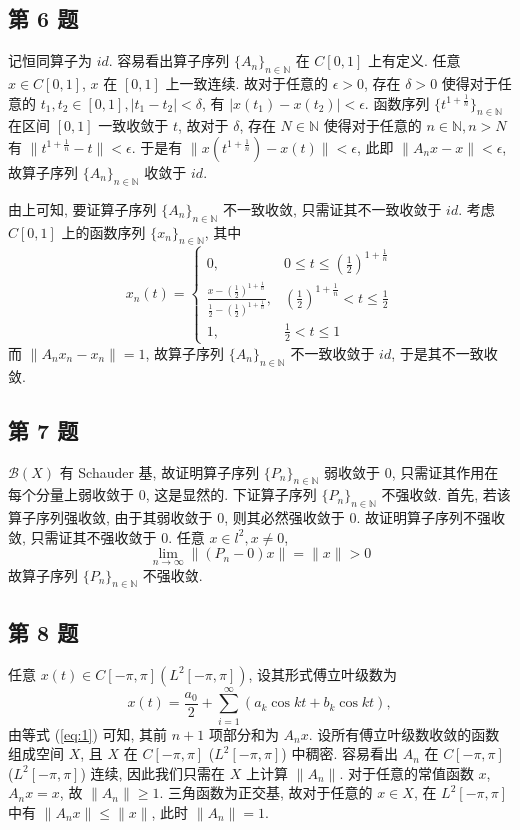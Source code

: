 \documentclass[\ROOT/main.tex]{subfiles}
\begin{document}
\subsection{第 6 题}
记恒同算子为 $id$.
容易看出算子序列 $\{ A_{n} \}_{n \in \mathbb{N}}$ 在 $C[0, 1]$ 上有定义.
任意 $x \in C[0, 1]$, $x$ 在 $[0,1]$ 上一致连续.
故对于任意的 $\epsilon > 0$,
存在 $\delta > 0$ 使得对于任意的 $t_1, t_2 \in [0, 1], | t_1 - t_2| < \delta$,
有 $| x(t_1) - x(t_2) | < \epsilon$.
函数序列 $\{ t^{1 + \frac{1}{n}} \}_{n \in \mathbb{N}}$ 在区间 $[0, 1]$ 一致收敛于 $t$,
故对于 $\delta$, 存在 $N \in \mathbb{N}$ 使得对于任意的 $n \in \mathbb{N}, n > N$ 有 $\| t^{1 + \frac{1}{n}} - t \| < \epsilon$.
于是有 $\| x(t^{1 + \frac{1}{n}}) - x(t) \| < \epsilon$,
此即 $\| A_n x - x \| < \epsilon$, 故算子序列 $\{ A_{n} \}_{n \in \mathbb{N}}$ 收敛于 $id$.

由上可知, 要证算子序列 $\{ A_{n} \}_{n \in \mathbb{N}}$ 不一致收敛, 只需证其不一致收敛于 $id$.
考虑 $C[0, 1]$ 上的函数序列 $\{ x_{n} \}_{n \in \mathbb{N}}$, 其中
\[
    x_n(t) = \begin{cases}
        0, & 0 \leqslant t \leqslant \left( \frac{1}{2} \right)^{1 + \frac{1}{n}} \\
        \frac{x - \left( \frac{1}{2} \right)^{1 + \frac{1}{n}}}{\frac{1}{2} - \left( \frac{1}{2} \right)^{1 + \frac{1}{n}}}, & \left( \frac{1}{2} \right)^{1 + \frac{1}{n}} < t \leqslant \frac{1}{2} \\
        1, & \frac{1}{2} < t \leqslant 1
    \end{cases}
\]
而 $\| A_n x_n - x_n \| = 1$, 故算子序列 $\{ A_{n} \}_{n \in \mathbb{N}}$ 不一致收敛于 $id$, 于是其不一致收敛.

\subsection{第 7 题}
$\mathscr{B}(X)$ 有 Schauder 基, 故证明算子序列 $\{ P_{n} \}_{n \in \mathbb{N}}$ 弱收敛于 $0$, 只需证其作用在每个分量上弱收敛于 $0$, 这是显然的.
下证算子序列 $\{ P_{n} \}_{n \in \mathbb{N}}$ 不强收敛.
首先, 若该算子序列强收敛, 由于其弱收敛于 $0$, 则其必然强收敛于 $0$.
故证明算子序列不强收敛, 只需证其不强收敛于 $0$.
任意 $x \in l^2, x \neq 0$,
\[
    \lim_{n \to \infty} \| (P_n - 0) x \| = \| x \| > 0
\]
故算子序列 $\{ P_{n} \}_{n \in \mathbb{N}}$ 不强收敛.


\subsection{第 8 题}
任意 $x(t) \in C[-\pi, \pi] (L^2[-\pi, \pi])$, 设其形式傅立叶级数为
\[
    x(t) = \frac{a_0}{2} + \sum_{i = 1}^{\infty}(a_k \cos{kt} + b_k \cos{kt}),
\]
由等式 (\ref{eq:1}) 可知, 其前 $n + 1$ 项部分和为 $A_n x$.
设所有傅立叶级数收敛的函数组成空间 $X$, 且 $X$ 在 $C[-\pi, \pi]$ ($L^2[-\pi, \pi]$) 中稠密.
容易看出 $A_n$ 在 $C[-\pi, \pi]$ ($L^2[-\pi, \pi]$) 连续, 因此我们只需在 $X$ 上计算 $\| A_n \|$.
对于任意的常值函数 $x$, $A_n x = x$, 故 $\| A_n \| \geqslant 1$.
三角函数为正交基, 故对于任意的 $x \in X$,
在 $L^2[-\pi, \pi]$ 中有 $\| A_n x \| \leqslant \| x \|$, 此时 $\| A_n \| = 1$.
\end{document}
